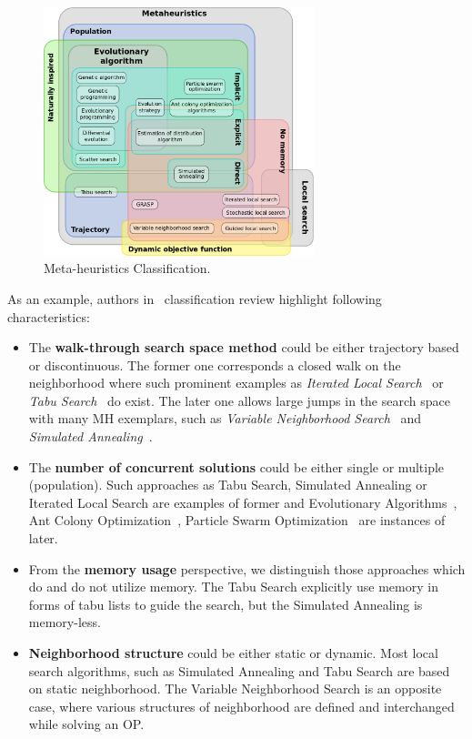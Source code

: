 \begin{figure}
	\centering
	\includegraphics[width=0.7\textwidth]{graphics/Background/Metaheuristics_classification}
	\caption{Meta-heuristics Classification.}
	\label{BG: MH classification}
\end{figure}

As an example, authors in~\cite{birattari2001classification} classification review highlight following characteristics:
\begin{itemize}[itemsep=8pt]
	\item The \textbf{walk-through search space method} could be either trajectory based or discontinuous. The former one corresponds a closed walk on the neighborhood where such prominent examples as \textit{Iterated Local Search}~\cite{lourencco2003iterated} or \textit{Tabu Search}~\cite{glover1989tabu} do exist. The later one allows large jumps in the search space with many MH exemplars, such as \textit{Variable Neighborhood Search}~\cite{hansen2003variable} and \textit{Simulated Annealing}~\cite{kirkpatrick1983optimization}.
	
	\item The \textbf{number of concurrent solutions} could be either single or multiple (population). Such approaches as Tabu Search, Simulated Annealing or Iterated Local Search are examples of former and Evolutionary Algorithms~\cite{eiben2015evolutionary}, Ant Colony Optimization~\cite{dorigo2007ant}, Particle Swarm Optimization~\cite{kennedy1995particle} are instances of later.
	
	\item From the \textbf{memory usage} perspective, we distinguish those approaches which do and do not utilize memory. The Tabu Search explicitly use memory in forms of tabu lists to guide the search, but the Simulated Annealing is memory-less.
	
	\item \textbf{Neighborhood structure} could be either static or dynamic. Most local search algorithms, such as Simulated Annealing and Tabu Search are based on static neighborhood. The Variable Neighborhood Search is an opposite case, where various structures of neighborhood are defined and interchanged while solving an OP. 
\end{itemize}

